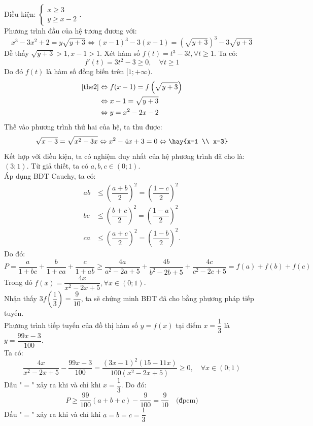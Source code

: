 \lgi
Điều kiện: $\begin{cases}x\geq 3 \\ y \geq x- 2\end{cases}$.\\
Phương trình đầu của hệ tương đương với:
\begin{equation} \label{the2}
x^3-3x^2+2=y\sqrt{y+3} \Leftrightarrow (x-1)^3 - 3(x-1) = \left(\sqrt{y+3}\right)^3-3\sqrt{y+3}
\end{equation}
Dễ thấy $\sqrt{y+3}>1, x-1>1$. Xét hàm số $f(t)=t^3-3t, \forall t \geq 1$. Ta có:
$$f'(t) = 3t^2-3 \geq 0, \quad \forall t \geq 1$$
Do đó $f(t)$ là hàm số đồng biến trên $[1;+\infty )$.
\begin{align*}
\eqref{the2} & \Leftrightarrow f(x-1)=f\left(\sqrt{y+3}\right) \\ & \Leftrightarrow x-1 = \sqrt{y+3} \\ & \Leftrightarrow y = x^2-2x-2
\end{align*}
Thế vào phương trình thứ hai của hệ, ta thu được:
$$\sqrt{x-3}=\sqrt{x^2-3x}\Leftrightarrow x^2-4x+3 = 0 \Leftrightarrow \hay{x=1 \\ x=3}$$
Kết hợp với điều kiện, ta có nghiệm duy nhất của hệ phương trình đã cho là: $(3;1)$.
\lgi
Từ giả thiết, ta có $a,b,c \in (0;1)$.\\
Áp dụng BĐT Cauchy, ta có:
\begin{align*}
ab & \leq \left(\dfrac{a+b}{2}\right)^2 = \left(\dfrac{1-c}{2}\right)^2 \\
bc & \leq \left(\dfrac{b+c}{2}\right)^2 = \left(\dfrac{1-a}{2}\right)^2 \\
ca & \leq \left(\dfrac{a+c}{2}\right)^2 = \left(\dfrac{1-b}{2}\right)^2 .
\end{align*}
Do đó:
$$P=\dfrac{a}{1+bc} + \dfrac{b}{1+ca}+\dfrac{c}{1+ab} \geq \dfrac{4a}{a^2-2a+5}+\dfrac{4b}{b^2-2b+5}+\dfrac{4c}{c^2-2c+5}=f(a)+f(b)+f(c)$$
Trong đó $f(x) = \dfrac{4x}{x^2-2x+5}, \forall x \in (0;1)$.\\
Nhận thấy $3f\left(\dfrac{1}{3}\right)=\dfrac{9}{10}$, ta sẽ chứng minh BĐT đã cho bằng phương pháp tiếp tuyến.\\
Phương trình tiếp tuyến của đồ thị hàm số $y=f(x)$ tại điểm $x=\dfrac{1}{3}$ là $y=\dfrac{99x-3}{100}.$\\
Ta có:
$$\dfrac{4x}{x^2-2x+5}-\dfrac{99x-3}{100} = \dfrac{(3x-1)^2(15-11x)}{100(x^2-2x+5)} \geq 0, \quad \forall x \in (0;1)$$
Dấu "$=$" xảy ra khi và chỉ khi $x=\dfrac{1}{3}$. Do đó:
$$P \geq \dfrac{99}{100}(a+b+c) - \dfrac{9}{100} = \dfrac{9}{10} \quad \text{(đpcm)}$$
Dấu "$=$" xảy ra khi và chỉ khi $a=b=c=\dfrac{1}{3}$
